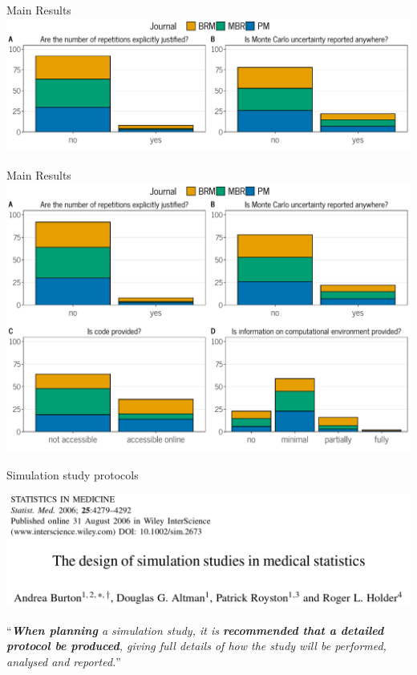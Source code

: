 \documentclass[english, 12pt, aspectratio=169]{beamer}
\begin{document}
\begin{frame}{Main Results}
\pause
   \includegraphics{pics/fig1_part1.pdf}
\end{frame}



\begin{frame}{Main Results}
   \includegraphics{pics/review-results.pdf}
\end{frame}


\begin{frame}{Simulation study protocols}
  \begin{block}{}
    \pause
    \centering
    \includegraphics[width = 0.8\linewidth,frame]{pics/burton.png}
    \nocite{Burton2006}

  \end{block}
  \begin{block}{}
    \begin{tcolorbox}[colframe=chineseBlue]
      ``\emph{\alert{\textbf{When planning}} a simulation study, it is
        \alert{\textbf{recommended that a detailed protocol be produced}},
        giving full details of how the study will be performed, analysed and
        reported.}''
    \end{tcolorbox}
  \end{block}

  \vfill

\end{frame}
\end{document}
